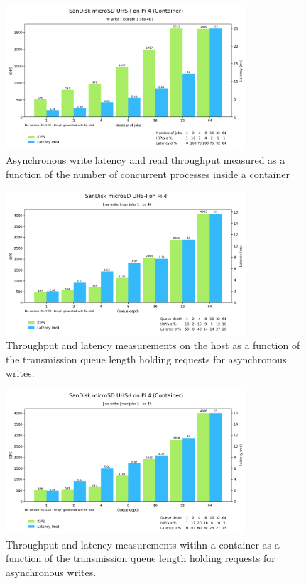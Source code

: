 \begin{figure}[H]
    \centering
    \includegraphics[width=0.8\textwidth]{images/results/sandisk-libaio-write-num-jobs-iops-latency.png}
    \caption{Asynchronous write latency and read throughput measured as a function of the number of concurrent processes inside a container}
    \label{images:fundamentals/net-ns-veth-arch.jpg}
\end{figure}

\begin{figure}[H]
    \centering
    \includegraphics[width=0.8\textwidth]{images/results/sandisk-host-libaio-write-queue-depth-iops-latency.png}
    \caption{Throughput and latency measurements on the host as a function of the transmission queue length holding requests for asynchronous writes.}
    \label{images:fundamentals/net-ns-veth-arch.jpg}
\end{figure}

\begin{figure}[H]
    \centering
    \includegraphics[width=0.8\textwidth]{images/results/sandisk-libaio-write-queue-depth-iops-latency.png}
    \caption{Throughput and latency measurements witihn a container as a function of the transmission queue length holding requests for asynchronous writes.}
    \label{images:fundamentals/net-ns-veth-arch.jpg}
\end{figure}


